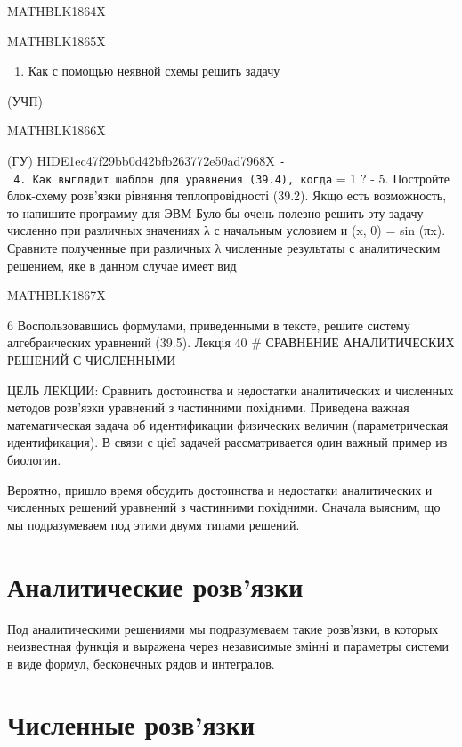 \documentclass[
  ukrainian,
]{article}
\providecommand{\tightlist}{%
  \setlength{\itemsep}{0pt}\setlength{\parskip}{0pt}}
\begin{document}
MATHBLK1864X

MATHBLK1865X

\begin{enumerate}
\def\labelenumi{\arabic{enumi}.}
\setcounter{enumi}{2}
\tightlist
\item
  Как с помощью неявной схемы решить задачу
\end{enumerate}

(УЧП)

MATHBLK1866X

(ГУ) HIDE1ec47f29bb0d42bfb263772e50ad7968X
\texttt{-\ 4.\ Как\ выглядит\ шаблон\ для\ уравнения\ (39.4),\ когда}
\lambda = 1 ? - 5. Постройте блок-схему розв'язки рівняння
теплопровідності (39.2). Якщо есть возможность, то напишите программу
для ЭВМ Було бы очень полезно решить эту задачу численно при различных
значениях λ с начальным условием и (x, 0) = sin (πx). Сравните
полученные при различных λ численные результаты с аналитическим
решением, яке в данном случае имеет вид

MATHBLK1867X

6 Воспользовавшись формулами, приведенными в тексте, решите систему
алгебраических уравнений (39.5). Лекція 40 \# СРАВНЕНИЕ АНАЛИТИЧЕСКИХ
РЕШЕНИЙ С ЧИСЛЕННЫМИ

ЦЕЛЬ ЛЕКЦИИ: Сравнить достоинства и недостатки аналитических и численных
методов розв'язки уравнений з частинними похідними. Приведена важная
математическая задача об идентификации физических величин
(параметрическая идентификация). В связи с цієї задачей рассматривается
один важный пример из биологии.

Вероятно, пришло время обсудить достоинства и недостатки аналитических и
численных решений уравнений з частинними похідними. Сначала выясним, що
мы подразумеваем под этими двумя типами решений.

\section{Аналитические
розв'язки}\label{ux430ux43dux430ux43bux438ux442ux438ux447ux435ux441ux43aux438ux435-ux440ux43eux437ux432ux44fux437ux43aux438}

Под аналитическими решениями мы подразумеваем такие розв'язки, в которых
неизвестная функція и выражена через независимые змінні и параметры
системи в виде формул, бесконечных рядов и интегралов.

\section{Численные
розв'язки}\label{ux447ux438ux441ux43bux435ux43dux43dux44bux435-ux440ux43eux437ux432ux44fux437ux43aux438}
\end{document}
